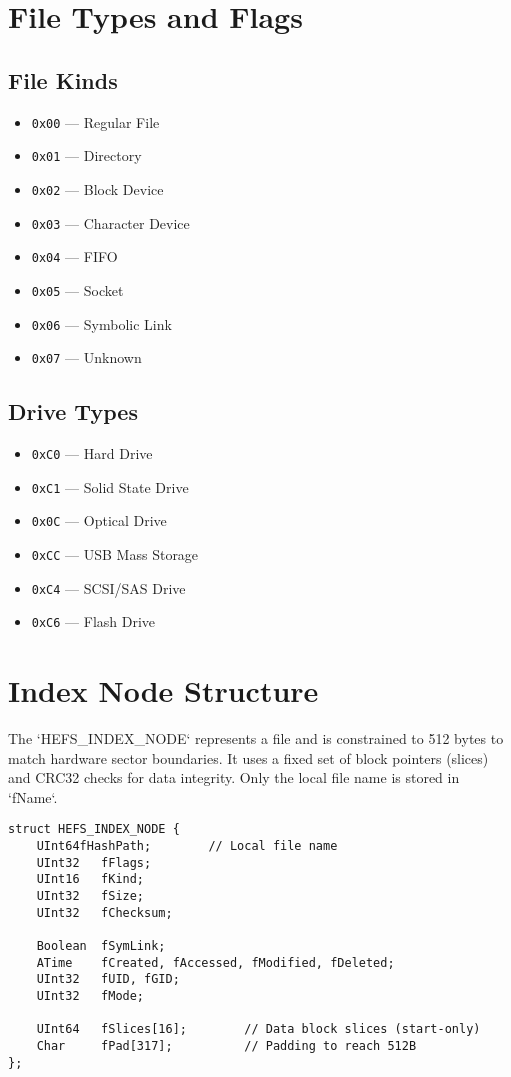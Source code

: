 \documentclass{article}
\begin{document}
\section{File Types and Flags}
\subsection*{File Kinds}
\begin{itemize}[label=--]
    \item \verb|0x00| --- Regular File
    \item \verb|0x01| --- Directory
    \item \verb|0x02| --- Block Device
    \item \verb|0x03| --- Character Device
    \item \verb|0x04| --- FIFO
    \item \verb|0x05| --- Socket
    \item \verb|0x06| --- Symbolic Link
    \item \verb|0x07| --- Unknown
\end{itemize}

\subsection*{Drive Types}
\begin{itemize}[label=--]
    \item \verb|0xC0| --- Hard Drive
    \item \verb|0xC1| --- Solid State Drive
    \item \verb|0x0C| --- Optical Drive
    \item \verb|0xCC| --- USB Mass Storage
    \item \verb|0xC4| --- SCSI/SAS Drive
    \item \verb|0xC6| --- Flash Drive
\end{itemize}

\section{Index Node Structure}
The `HEFS\_INDEX\_NODE` represents a file and is constrained to 512 bytes to match hardware sector boundaries. It uses a fixed set of block pointers (slices) and CRC32 checks for data integrity. Only the local file name is stored in `fName`.

\begin{lstlisting}[style=cstyle, caption={HEFS\_INDEX\_NODE (Fits 512B)}]
struct HEFS_INDEX_NODE {
    UInt64fHashPath;        // Local file name
    UInt32   fFlags;
    UInt16   fKind;
    UInt32   fSize;
    UInt32   fChecksum;

    Boolean  fSymLink;
    ATime    fCreated, fAccessed, fModified, fDeleted;
    UInt32   fUID, fGID;
    UInt32   fMode;

    UInt64   fSlices[16];        // Data block slices (start-only)
    Char     fPad[317];          // Padding to reach 512B
};
\end{lstlisting}
\end{document}
